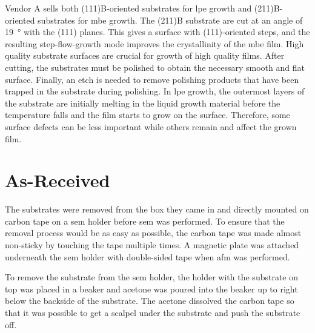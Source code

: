 
Vendor A sells both (111)B-oriented substrates for \ac{lpe} growth and (211)B-oriented substrates for \ac{mbe} growth. The (211)B substrate are cut at an angle of \SI{19}{\degree} with the (111) planes. This gives a surface with (111)-oriented steps, and the resulting step-flow-growth mode improves the crystallinity of the \ac{mbe} film. High quality substrate surfaces are crucial for growth of high quality films. After cutting, the substrates must be polished to obtain the necessary smooth and flat surface. Finally, an etch is needed to remove polishing products that have been trapped in the substrate during polishing. In \ac{lpe} growth, the outermost layers of the substrate are initially melting in the liquid growth material before the temperature falls and the film starts to grow on the surface. Therefore, some surface defects can be less important while others remain and affect the grown film.


\section{As-Received}
The substrates were removed from the box they came in and directly mounted on carbon tape on a \ac{sem} holder before \ac{sem} was performed. To ensure that the removal process would be as easy as possible, the carbon tape was made almost non-sticky by touching the tape multiple times. A magnetic plate was attached underneath the \ac{sem} holder with double-sided tape when \ac{afm} was performed. 

To remove the substrate from the \ac{sem} holder, the holder with the substrate on top was placed in a beaker and acetone was poured into the beaker up to right below the backside of the substrate. The acetone dissolved the carbon tape so that it was possible to get a scalpel under the substrate and push the substrate off. %

